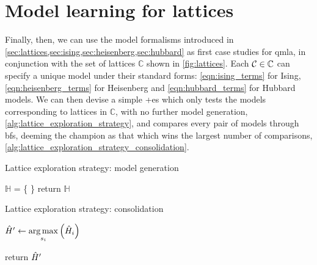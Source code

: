 \section{Model learning for lattices}
Finally, then, we can use the model formalisms introduced in \cref{sec:lattices,sec:ising,sec:heisenberg,sec:hubbard}
as first case studies for \gls{qmla}, in conjunction with the set of lattices $\mathbb{C}$ shown in \cref{fig:lattices}. 
Each ${ \mathcal{C}} \in \mathbb{C}$ can specify a unique model under their standard forms:
\cref{eqn:ising_terms} for Ising, \cref{eqn:heisenberg_terms} for Heisenberg 
and \cref{eqn:hubbard_terms} for Hubbard models.     
We can then devise a simple \glsxtrfull+{es} which only tests the models corresponding to lattices in $\mathbb{C}$, 
with no further model generation, \cref{alg:lattice_exploration_strategy}, 
and compares every pair of models through \glspl{bf}, 
deeming the champion as that which wins the largest number of comparisons, 
\cref{alg:lattice_exploration_strategy_consolidation}.

\begin{algorithm}
\caption{Lattice exploration strategy: model generation}
\label{alg:lattice_exploration_strategy}
\DontPrintSemicolon
{}

\;

$\mathbb{H}$ = \{ \}\;
return $\mathbb{H}$
\end{algorithm}

\begin{algorithm}
\caption{Lattice exploration strategy: consolidation}
\label{alg:lattice_exploration_strategy_consolidation}
\DontPrintSemicolon
{}

\;


$\hat{H}^{\prime} \gets \operatorname*{arg\,max}\limits_{s_i} \left(\hat{H}_i\right)$

return $\hat{H}^{\prime}$
\end{algorithm}


